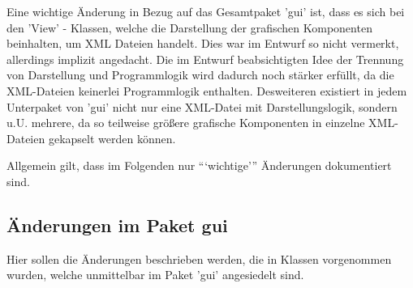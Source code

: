Eine wichtige Änderung in Bezug auf das Gesamtpaket 'gui' ist, dass es sich bei den 'View' - Klassen, welche die Darstellung der grafischen Komponenten beinhalten, um XML Dateien handelt. Dies war im Entwurf so nicht vermerkt, allerdings implizit angedacht. Die im Entwurf beabsichtigten Idee der Trennung von Darstellung und Programmlogik wird dadurch noch stärker erfüllt, da die XML-Dateien keinerlei Programmlogik enthalten. Desweiteren existiert in jedem Unterpaket von 'gui' nicht nur eine XML-Datei mit Darstellungslogik, sondern u.U. mehrere, da so teilweise größere grafische Komponenten in einzelne XML-Dateien gekapselt werden können.
	
Allgemein gilt, dass im Folgenden nur ```wichtige''' Änderungen dokumentiert sind.

\subsection{Änderungen im Paket gui}
Hier sollen die Änderungen beschrieben werden, die in Klassen vorgenommen wurden, welche unmittelbar im Paket 'gui' angesiedelt sind.
